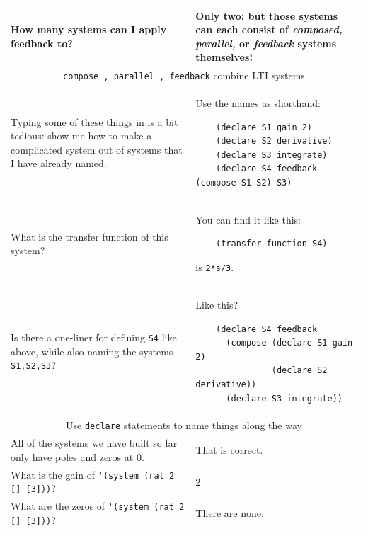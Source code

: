 \documentclass[11pt,letter]{article}
\begin{document}
\begin{longtable}{ p{} p{} }
  How many systems can I apply feedback to?
  &
  Only two: but those systems can each consist of \emph{composed, parallel,} or \emph{feedback} systems themselves! \\

  \midrule

  \multicolumn{2}{c}{\Large\lstinline!compose , parallel , feedback! combine LTI systems} \\

  \midrule

  Typing some of these things in is a bit tedious: show me how to make a complicated system out of systems that I have already named.
  &
  Use the names as shorthand:
  \begin{lstlisting}
    (declare S1 gain 2)
    (declare S2 derivative)
    (declare S3 integrate)
    (declare S4 feedback (compose S1 S2) S3)
  \end{lstlisting} \\

  What is the transfer function of this system?
  &
  You can find it like this:
  \begin{lstlisting}
    (transfer-function S4)
  \end{lstlisting}
  is \lstinline!2*s/3!. \\

  Is there a one-liner for defining \lstinline!S4! like above, while also naming the systems \lstinline!S1,S2,S3!?
  &
  Like this?
  \begin{lstlisting}
    (declare S4 feedback
      (compose (declare S1 gain 2)
               (declare S2 derivative))
      (declare S3 integrate))
  \end{lstlisting} \\

  \midrule

  \multicolumn{2}{c}{\Large Use \lstinline!declare! statements to name things along the way} \\

  \midrule

  All of the systems we have built so far only have poles and zeros at $0$.
  &
  That is correct. \\

  What is the gain of \lstinline!'(system (rat 2 [] [3]))!?
  &
  $2$ \\

  What are the zeros of \lstinline!'(system (rat 2 [] [3]))!?
  &
  There are none. \\


\end{longtable}
\end{document}
